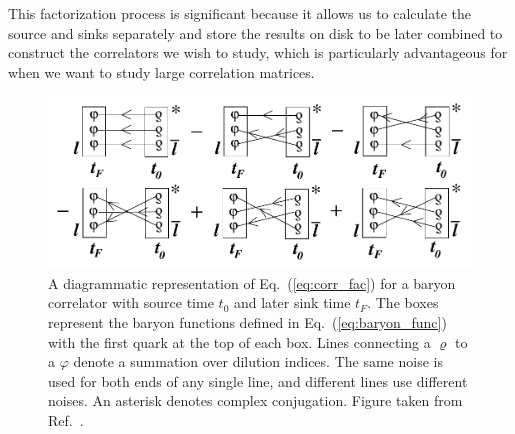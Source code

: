This factorization process is significant because it allows us to calculate the source and sinks separately and store the results on disk to be later combined to construct the correlators we wish to study, which is particularly advantageous for when we want to study large correlation matrices.
\begin{figure}
    \centering
    \includegraphics[width=6in]{figures/baryon_corr_diag.pdf}
    \caption{A diagrammatic representation of Eq.~(\ref{eq:corr_fac}) for a baryon correlator with source time $t_0$ and later sink time $t_F$. The boxes represent the baryon functions defined in Eq.~(\ref{eq:baryon_func}) with the first quark at the top of each box. Lines connecting a $\varrho$ to a $\varphi$ denote a summation over dilution indices. The same noise is used for both ends of any single line, and different lines use different noises. An asterisk denotes complex conjugation. Figure taken from Ref.~\cite{spectroscopy}.}
    \label{fig:baryon_corr}
\end{figure}